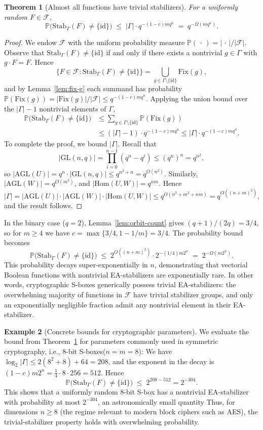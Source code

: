 \documentclass[11pt]{article}
\newtheorem{theorem}{Theorem}[section]
\theoremstyle{definition}
\newtheorem{example}[theorem]{Example}
\newcommand{\Fcal}{\mathcal{F}}
\newcommand{\Gam}{\Gamma}
\newcommand{\GL}{\mathrm{GL}}
\newcommand{\AGL}{\mathrm{AGL}}
\newcommand{\id}{\mathrm{id}}
\newcommand{\Hom}{\mathrm{Hom}}
\newcommand{\Stab}{\mathrm{Stab}}
\newcommand{\Fix}{\mathrm{Fix}}
\renewcommand{\Pr}{\mathbb{P}}
\begin{document}
\begin{theorem}[Almost all functions have trivial stabilizers]\label{thm:trivial-stab}
For a uniformly random $F\in\Fcal$,
\[
  \Pr\bigl(\Stab_\Gam(F)\neq\{\id\}\bigr)
  \;\le\;
  |\Gam|\cdot q^{-(1-c)mq^n}
  \;=\;
  q^{-\Omega(mq^n)}.
\]
\end{theorem}

\begin{proof}
We endow $\Fcal$ with the uniform probability measure $\Pr(\,\cdot\,)=|\,\cdot\,|/|\Fcal|$.
Observe that $\Stab_\Gam(F)\neq\{\id\}$ if and only if there exists a nontrivial
$g\in\Gam$ with $g\cdot F=F$. Hence
\[
   \{F\in\Fcal:\Stab_\Gam(F)\neq\{\id\}\}
   = \bigcup_{g\in\Gam\setminus\{\id\}} \Fix(g),
\]
and by Lemma~\ref{lem:fix-g} each summand has probability
$\Pr(\Fix(g))=|\Fix(g)|/|\Fcal|\le q^{-(1-c)mq^n}$.
Applying the union bound over the $|\Gam|-1$ nontrivial elements of $\Gam$,
\begin{align*}
   \Pr\bigl(\Stab_\Gam(F)\neq\{\id\}\bigr)
   &\le \sum_{g\in\Gam\setminus\{\id\}} \Pr(\Fix(g)) \\
   &\le (|\Gam|-1)\cdot q^{-(1-c)mq^n}
   \le |\Gam|\cdot q^{-(1-c)mq^n}.
\end{align*}
To complete the proof, we bound $|\Gam|$. Recall that
\[
   |\GL(n,q)| = \prod_{i=0}^{n-1}(q^n-q^i) \le (q^n)^n = q^{n^2},
\]
so $|\AGL(U)| = q^n\cdot|\GL(n,q)| \le q^{n^2+n} = q^{O(n^2)}$.
Similarly, $|\AGL(W)| = q^{O(m^2)}$, and $|\Hom(U,W)|=q^{nm}$. Hence
\[
   |\Gam| = |\AGL(U)|\cdot|\AGL(W)|\cdot|\Hom(U,W)|
   \le q^{O(n^2+m^2+nm)} = q^{O((n+m)^2)},
\]
and the result follows.
\end{proof}

In the binary case ($q=2$), Lemma~\ref{lem:orbit-count} gives $(q+1)/(2q)=3/4$,
so for $m\ge 4$ we have $c=\max\{3/4,1-1/m\}=3/4$. The probability bound becomes
\[
   \Pr\bigl(\Stab_\Gam(F)\neq\{\id\}\bigr)
   \;\le\;
   2^{O((n+m)^2)} \cdot 2^{-(1/4)m2^n}
   \;=\;
   2^{-\Omega(m2^n)}.
\]
This probability decays super-exponentially in $n$, demonstrating that
vectorial Boolean functions with nontrivial EA-stabilizers are exponentially
rare. In other words, cryptographic S-boxes generically possess trivial EA-stabilizers:
the overwhelming majority of functions in $\Fcal$ have trivial stabilizer groups,
and only an exponentially negligible fraction admit any nontrivial element in their
EA-stabilizer.

\begin{example}[Concrete bounds for cryptographic parameters]\label{ex:concrete}
We evaluate the bound from Theorem~\ref{thm:trivial-stab} for parameters
commonly used in symmetric cryptography, i.e., $8$-bit S-boxes($n=m=8$):
We have
$\log_2|\Gam| \le 2(8^2+8) + 64 = 208$,
and the exponent in the decay is
$(1-c)m 2^n = \frac{1}{4}\cdot 8\cdot 256 = 512$.
Hence
\[
   \Pr\bigl(\Stab_\Gam(F)\neq\{\id\}\bigr)
   \;\le\; 2^{208-512} = 2^{-304}.
\]
This shows that a uniformly random $8$-bit S-box has a nontrivial
EA-stabilizer with probability at most $2^{-304}$, an astronomically
small quantity
Thus, for dimensions $n\ge 8$ (the regime relevant to modern block ciphers such as AES),
the trivial-stabilizer property holds with overwhelming probability.
\end{example}
\end{document}
